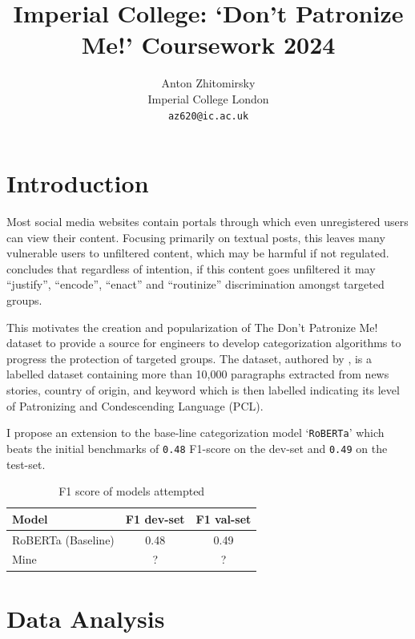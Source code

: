 \documentclass[11pt,a4paper]{article}
\title{Imperial College: `Don't Patronize Me!' Coursework 2024}
\author{Anton Zhitomirsky \\
  Imperial College London \\
  \texttt{az620@ic.ac.uk}
}
\begin{document}
\maketitle

\section{Introduction}


Most social media websites contain portals through which even unregistered users can view their content. Focusing primarily on textual posts, this leaves many vulnerable users to unfiltered content, which may be harmful if not regulated. \citet{Ng-discrimination} concludes that regardless of intention, if this content goes unfiltered it may ``justify'', ``encode'', ``enact'' and ``routinize'' discrimination amongst targeted groups.

This motivates the creation and popularization of The Don't Patronize Me! dataset to provide a source for engineers to develop categorization algorithms to progress the protection of targeted groups. The dataset, authored by \citet{perez-almendros-etal-2020-dont}, is a labelled dataset containing more than 10,000 paragraphs extracted from news stories, country of origin, and keyword which is then labelled indicating its level of Patronizing and Condescending Language (PCL).

I propose an extension to the base-line categorization model `\texttt{RoBERTa}' which beats the initial benchmarks of \texttt{0.48} F1-score on the dev-set and \texttt{0.49} on the test-set.

\begin{table}[!h]
    \centering
    \begin{tabular}{ |l||c|c|  }
        \hline
        Model              & F1 dev-set & F1 val-set \\
        \hline
        RoBERTa (Baseline) & 0.48       & 0.49       \\
        \hline
        Mine               & ?          & ?          \\
        \hline
    \end{tabular}
    \caption{F1 score of models attempted}    
\end{table}

\section{Data Analysis}
\end{document}
